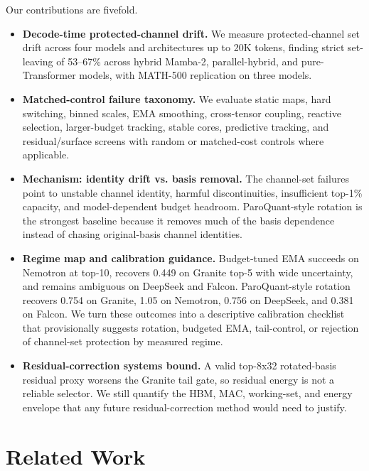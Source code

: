 \documentclass{article}
\begin{document}
Our contributions are fivefold.
\begin{itemize}
\item \textbf{Decode-time protected-channel drift.} We measure protected-channel set drift across four models and architectures up to 20K tokens, finding strict set-leaving of 53--67\% across hybrid Mamba-2, parallel-hybrid, and pure-Transformer models, with MATH-500 replication on three models.
\item \textbf{Matched-control failure taxonomy.} We evaluate static maps, hard switching, binned scales, EMA smoothing, cross-tensor coupling, reactive selection, larger-budget tracking, stable cores, predictive tracking, and residual/surface screens with random or matched-cost controls where applicable.
\item \textbf{Mechanism: identity drift vs. basis removal.} The channel-set failures point to unstable channel identity, harmful discontinuities, insufficient top-1\% capacity, and model-dependent budget headroom. ParoQuant-style rotation is the strongest baseline because it removes much of the basis dependence instead of chasing original-basis channel identities.
\item \textbf{Regime map and calibration guidance.} Budget-tuned EMA succeeds on Nemotron at top-10, recovers 0.449 on Granite top-5 with wide uncertainty, and remains ambiguous on DeepSeek and Falcon. ParoQuant-style rotation recovers 0.754 on Granite, 1.05 on Nemotron, 0.756 on DeepSeek, and 0.381 on Falcon. We turn these outcomes into a descriptive calibration checklist that provisionally suggests rotation, budgeted EMA, tail-control, or rejection of channel-set protection by measured regime.
\item \textbf{Residual-correction systems bound.} A valid top-8x32 rotated-basis residual proxy worsens the Granite tail gate, so residual energy is not a reliable selector. We still quantify the HBM, MAC, working-set, and energy envelope that any future residual-correction method would need to justify.
\end{itemize}

\section{Related Work}
\end{document}
